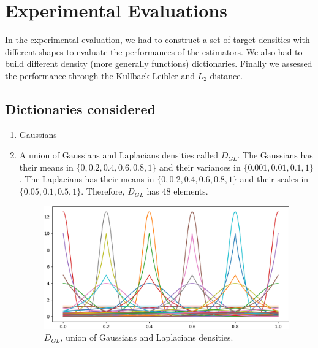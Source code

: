 \section{Experimental Evaluations}

In the experimental evaluation, we had to construct a set of target densities with different shapes to evaluate the performances of the estimators. We also had to build different density (more generally functions) dictionaries. Finally we assessed the performance through the Kullback-Leibler and $L_2$ distance.

\subsection{Dictionaries considered}
\begin{enumerate}
\item Gaussians
\item A union of Gaussians and Laplacians densities called $D_{GL}$. The Gaussians has their means in $\{0, 0.2, 0.4, 0.6, 0.8, 1\}$ and their variances in $\{0.001, 0.01, 0.1, 1\}$. The Laplacians has their means in $\{0, 0.2, 0.4, 0.6, 0.8, 1\}$ and their scales in $\{0.05, 0.1, 0.5, 1\}$. Therefore, $D_{GL}$ has 48 elements.

\begin{figure}[h]
\centering
\includegraphics[width=1\textwidth]{TeX_files/lapl_gauss_dict.png}
\caption{$D_{GL}$, union of Gaussians and Laplacians densities.}
\end{figure}
\end{enumerate}

